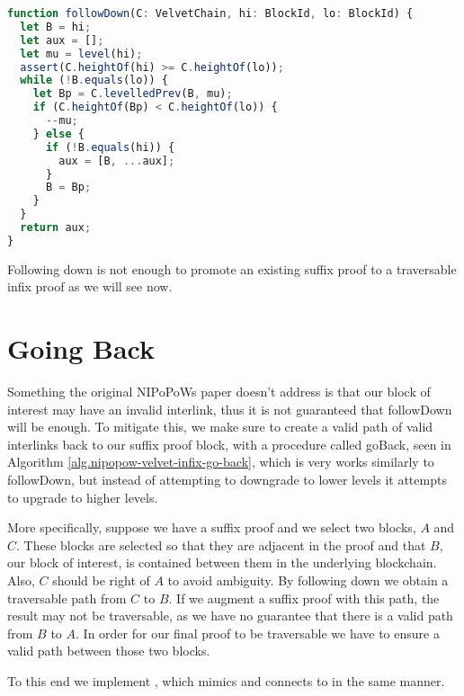 
\begin{lstlisting}[language=Javascript]
function followDown(C: VelvetChain, hi: BlockId, lo: BlockId) {
  let B = hi;
  let aux = [];
  let mu = level(hi);
  assert(C.heightOf(hi) >= C.heightOf(lo));
  while (!B.equals(lo)) {
    let Bp = C.levelledPrev(B, mu);
    if (C.heightOf(Bp) < C.heightOf(lo)) {
      --mu;
    } else {
      if (!B.equals(hi)) {
        aux = [B, ...aux];
      }
      B = Bp;
    }
  }
  return aux;
}
\end{lstlisting}

Following down is not enough to promote an existing suffix proof to a traversable infix proof as we will see now.

\section{Going Back}


Something the original NIPoPoWs paper doesn't address is that our block of interest may have an invalid interlink, thus it is not guaranteed that \textsf{followDown} will be enough. To mitigate this, we make sure to create a valid path of valid interlinks back to our suffix proof block, with a procedure called \textsf{goBack}, seen in Algorithm \ref{alg.nipopow-velvet-infix-go-back}, which is very works similarly to \textsf{followDown}, but instead of attempting to downgrade to lower levels it attempts to upgrade to higher levels.



More specifically, suppose we have a suffix proof and we select two blocks, $A$ and $C$. These blocks are selected so that they are adjacent in the proof and that $B$, our block of interest, is contained between them in the underlying blockchain. Also, $C$ should be right of $A$ to avoid ambiguity. By following down we obtain a traversable path from $C$ to $B$. If we augment a suffix proof with this path, the result may not be traversable, as we have no guarantee that there is a valid path from $B$ to $A$. In order for our final proof to be traversable we have to ensure a valid path between those two blocks.

To this end we implement , which mimics  and connects  to  in the same manner.

